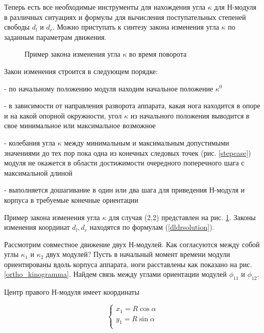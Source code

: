 Теперь есть все необходимые инструменты для нахождения угла $\kappa$ для Н-модуля в различных ситуациях и формулы для вычисления поступательных степеней свободы $d_l$ и $d_r$. Можно приступать к синтезу закона изменения угла $\kappa$ по заданным параметрам движения.

\begin{figure}[h]
\caption{Пример закона изменения угла $\kappa$ во время поворота}
\label{controlsignal}
\end{figure}

Закон изменения строится в следующем порядке:

- по начальному положению модуля находим начальное положение $\kappa^0$


- в зависимости от направления разворота аппарата, какая нога находится в опоре и на какой опорной окружности, угол $\kappa$ из начального положения выводится в свое минимальное или максимальное возможное


- колебания угла $\kappa$ между минимальным и максимальным допустимыми значениями до тех пор пока одна из конечных следовых точек (рис. \ref{stepcase}) модуля не окажется в области достижимости очередного поперечного шага с максимальной длиной

- выполняется дошагивание в один или два шага для приведения Н-модуля и корпуса в требуемые конечные ориентации



Пример закона изменения угла $\kappa$ для случая (2,2) представлен на рис. \ref{controlsignal}. Законы изменения координат $d_l,d_r$ находятся по формулам (\ref{dldrsolution}).


Рассмотрим совместное движение двух Н-модулей. Как согласуются между собой углы $\kappa_1$ и $\kappa_2$ двух модулей? Пусть в начальный момент времени модули ориентированы вдоль корпуса аппарата, ноги расставлены как показано на рис. \ref{ortho_kinogramma}. Найдем связь между углами ориентации модулей $\phi_{11}$ и $\phi_{12}$.

Центр правого Н-модуля имеет координаты

$$
\left\{
\begin{array}{lcr}
x_1 = R\cos{\alpha}\\
y_1 = R\sin{\alpha}\\
\end{array}
\right.
$$

